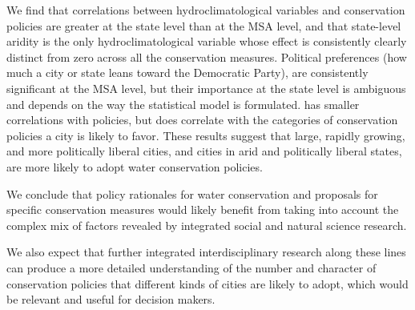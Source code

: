 \documentclass[draft,linenumbers]{agujournal}\usepackage{knitr}
\begin{document}
We find that correlations between
hydroclimatological variables
and conservation policies are greater at the state level than at
the MSA level, and that state-level aridity is the only hydroclimatological
variable whose effect is consistently clearly distinct
from zero across all the conservation measures.
Political preferences (how much a city or state leans toward the Democratic
Party), are consistently significant at the MSA level, but their importance at the state
level is ambiguous and depends on the way the statistical model is formulated.
 has smaller correlations with policies, but
does correlate with the
categories of conservation policies a city is likely to favor.
These results suggest that large, rapidly growing, and more politically liberal
cities, and cities in arid and politically liberal states,
are
more likely to
adopt water conservation policies.

We conclude that policy
rationales for water conservation and proposals for specific conservation measures
would likely benefit from taking into account the complex mix of factors revealed
by integrated social and natural science research.

We also expect that further integrated interdisciplinary research along
these lines can produce a more detailed understanding of the number and character
of conservation policies that different kinds of cities are likely to adopt,
which would be relevant and useful for decision makers.
\end{document}

